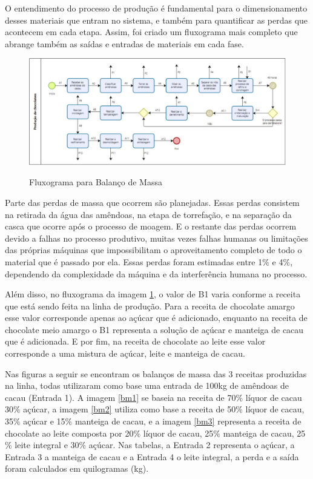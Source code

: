 \documentclass[
	12pt,				%
	openright,			%
	oneside,			%
	a4paper,			%
	english,			%
	french,				%
	spanish,			%
	brazil				%
	]{abntex2}
\begin{document}
O entendimento do processo de produção é fundamental para o dimensionamento desses materiais que entram no sistema, e também para quantificar as perdas que acontecem em cada etapa. Assim, foi criado um fluxograma mais completo que abrange também as saídas e entradas de materiais em cada fase.

\begin{figure}[H]
\begin{center}
\caption{Fluxograma para Balanço de Massa}
\includegraphics[scale=0.34]{../../Pictures/fluxo2.jpeg} 
\label{fluxo2}
\end{center}
\end{figure}

Parte das perdas de massa que ocorrem são planejadas. Essas perdas consistem na retirada da água das amêndoas, na etapa de torrefação, e na separação da casca que ocorre após o processo de moagem. E o restante das perdas ocorrem devido a falhas no processo produtivo, muitas vezes falhas humanas ou limitações das próprias máquinas que impossibilitam o aproveitamento completo de todo o material que é passado por ela. Essas perdas foram estimadas entre 1$\%$ e 4$\%$, dependendo da complexidade da máquina e da interferência humana no processo. 

Além disso, no fluxograma da imagem \ref{fluxo2}, o valor de B1 varia conforme a receita que está sendo feita na linha de produção. Para a receita de chocolate amargo esse valor corresponde apenas ao açúcar que é adicionado, enquanto na receita de chocolate meio amargo o B1 representa a solução de açúcar e manteiga de cacau que é adicionada. E por fim, na receita de chocolate ao leite esse valor corresponde a uma mistura de açúcar, leite e manteiga de cacau.

Nas figuras a seguir se encontram os balanços de massa das 3 receitas produzidas na linha, todas utilizaram como base uma entrada de 100kg de amêndoas de cacau (Entrada 1). A imagem \ref{bm1} se baseia na receita de 70$\%$ líquor de cacau 30$\%$ açúcar, a imagem \ref{bm2} utiliza como base a receita de 50$\%$ líquor de cacau, 35$\%$ açúcar e 15$\%$ manteiga de cacau, e a imagem \ref{bm3} representa a receita de chocolate ao leite composta por 20$\%$ líquor de cacau, 25$\%$ manteiga de cacau, 25$\%$ leite integral e 30$\%$ açúcar. Nas tabelas, a Entrada 2 representa o açúcar, a Entrada 3 a manteiga de cacau e a Entrada 4 o leite integral, a perda e a saída foram calculados em quilogramas (kg).
\end{document}
